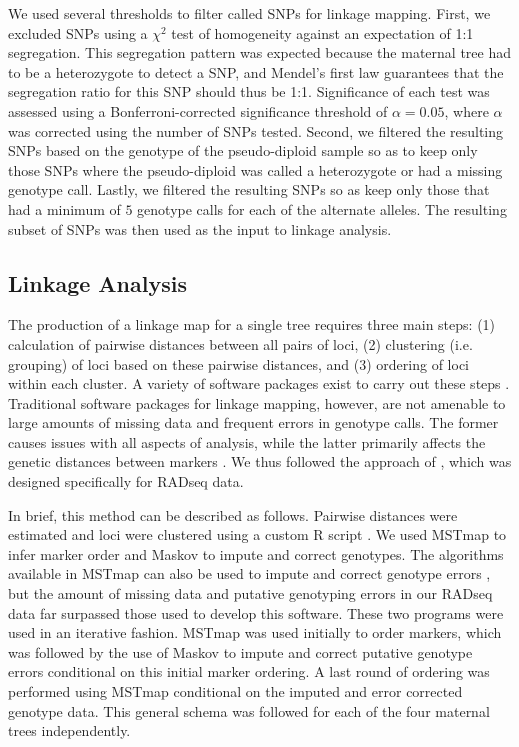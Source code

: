 \documentclass[11pt]{article}
\begin{document}
We used several thresholds to filter called SNPs for linkage mapping. First, 
we excluded SNPs using a $\chi^2$ test of homogeneity against an expectation of 1:1 segregation. This segregation pattern was expected because
the maternal tree had to be a heterozygote to detect a SNP, and Mendel's first law 
guarantees that the segregation ratio for this SNP should thus be 1:1. Significance of each test was 
assessed using a Bonferroni-corrected significance threshold of $\alpha = 0.05$, where $\alpha$ was corrected using the number of SNPs tested. 
Second, we filtered the resulting SNPs based on the genotype of the pseudo-diploid sample so as to keep only those SNPs
where the pseudo-diploid was called a heterozygote or had a missing genotype call.
Lastly, we filtered the resulting SNPs so as keep only those that had a minimum of $5$
genotype calls for each of the alternate alleles. The resulting subset of SNPs was then used as the input to linkage analysis. 

\subsection*{Linkage Analysis}
The production of a linkage map for a single tree requires three main steps: (1) calculation of 
pairwise distances between all pairs of loci, (2) clustering (i.e. grouping) of loci based on these pairwise distances, 
and (3) ordering of loci within each cluster.  A variety of software packages exist to carry out these steps \citep[e.g.,][]{VanOoijen:2011}.
Traditional software packages for linkage mapping, however, are not amenable to large amounts of missing data and frequent
errors in genotype calls. The former causes issues with all aspects of analysis, while the latter primarily affects the 
genetic distances between markers \citep{Cartwright:2007}. We thus followed the approach of \citet{Ward:2013}, 
which was designed specifically for RADseq data. 

In brief, this method can be described as follows. Pairwise distances were estimated and loci were clustered using a 
custom R script \citep[see File S2;][]{R:2013}. We used MSTmap \citep{Wu:2008a} 
to infer marker order and Maskov \citep{Ward:2013} to impute and correct genotypes. The algorithms available
in MSTmap can also be used to impute and correct genotype errors \citep[see][]{Wu:2008a}, but the amount of missing
data and putative genotyping errors in our RADseq data far surpassed those used to develop this software. These two programs
were used in an iterative fashion. MSTmap was used initially to order markers, which was followed by the use of Maskov
to impute and correct putative genotype errors conditional on this initial marker ordering. A last round of ordering 
was performed using MSTmap conditional on the imputed and error corrected genotype data. This general schema
was followed for each of the four maternal trees independently.
\end{document}
